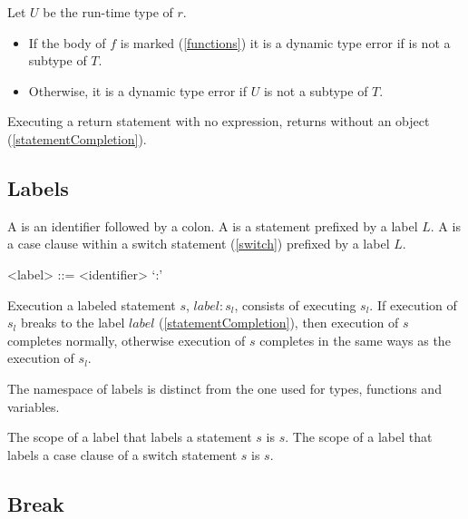 \documentclass[makeidx]{article}
\begin{document}
{\LMHash{}%
Let $U$ be the run-time type of $r$.
\begin{itemize}
\item
  If the body of $f$ is marked \ASYNC{} (\ref{functions})
  it is a dynamic type error if  is not a subtype of $T$.
\item
  Otherwise, it is a dynamic type error if $U$ is not a subtype of $T$.
\end{itemize}

\LMHash{}%
Executing a return statement with no expression,
\code{\RETURN;}
returns without an object
(\ref{statementCompletion}).


\subsection{Labels}

\LMHash{}%
A  is an identifier followed by a colon.
A  is a statement prefixed by a label $L$.
A  is a case clause within a switch statement
(\ref{switch})
prefixed by a label $L$.


\begin{grammar}
<label> ::= <identifier> `:'
\end{grammar}

\LMHash{}%
Execution a labeled statement $s$, $label: s_l$, consists of executing $s_l$.
If execution of $s_l$ breaks to the label $label$ (\ref{statementCompletion}),
then execution of $s$ completes normally,
otherwise execution of $s$ completes in the same ways as the execution of $s_l$.

\LMHash{}%
The namespace of labels is distinct from the one used for
types, functions and variables.

\LMHash{}%
The scope of a label that labels a statement $s$ is $s$.
The scope of a label that labels a case clause of a switch statement $s$ is $s$.



\subsection{Break}

}
\end{document}
